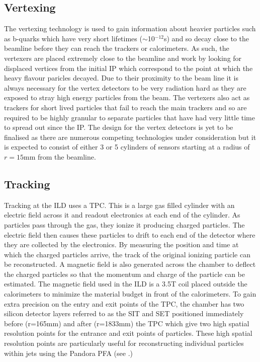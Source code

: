 \subsection{Vertexing}
The vertexing technology is used to gain information about heavier particles such as b-quarks which have very short lifetimes ($\sim$10$^{-12}$s) and so decay close to the beamline before they can reach the trackers or calorimeters. As such, the vertexers are placed extremely close to the beamline and work by looking for displaced vertices from the initial \ac{IP} which correspond to the point at which the heavy flavour paricles decayed. Due to their proximity to the beam line it is always necessary for the vertex detectors to be very radiation hard as they are exposed to stray high energy particles from the beam. The vertexers also act as trackers for short lived particles that fail to reach the main trackers and so are required to be highly granular to separate particles that have had very little time to spread out since the \ac{IP}. The design for the vertex detectors is yet to be finalised as there are numerous competing technologies under consideration but it is expected to consist of either 3 or 5 cylinders of sensors starting at a radius of $r=15$mm from the beamline.

\subsection{Tracking}
Tracking at the \ac{ILD} uses a \ac{TPC}. This is a large gas filled cylinder with an electric field across it and readout electronics at each end of the cylinder. As particles pass through the gas, they ionize it producing charged particles. The electric field then causes these particles to drift to each end of the detector where they are collected by the electronics. By measuring the position and time at which the charged particles arrive, the track of the original ionizing particle can be reconstructed. A magnetic field is also generated across the chamber to deflect the charged particles so that the momentum and charge of the particle can be estimated. The magnetic field used in the ILD is a 3.5T coil placed outside the calorimeters to minimize the material budget in front of the calorimeters. To gain extra precision on the entry and exit points of the \ac{TPC}, the chamber has two silicon detector layers referred to as the \ac{SIT} and \ac{SET} positioned  immediately before (r=165mm) and after (r=1833mm) the \ac{TPC} which give two high spatial resolution points for the entrance and exit points of particles. These high spatial resolution points are particularly useful for reconstructing individual particles within jets using the Pandora \ac{PFA} (see .)

